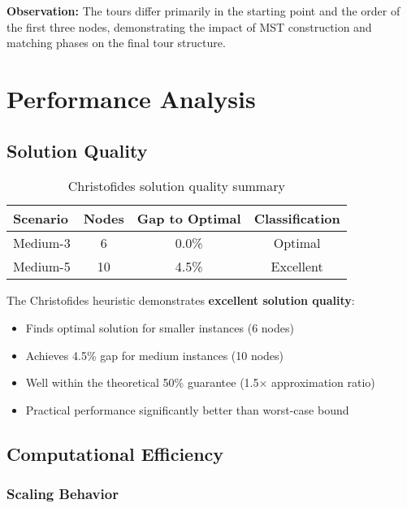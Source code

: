 \documentclass[9pt,a4paper,twoside]{tau}
\begin{document}
\textbf{Observation:} The tours differ primarily in the starting point and the order of the first three nodes, demonstrating the impact of MST construction and matching phases on the final tour structure.


\section{Performance Analysis}

\subsection{Solution Quality}

\begin{table}[h]
\centering
\begin{tabular}{@{}lccc@{}}
\toprule
\textbf{Scenario} & \textbf{Nodes} & \textbf{Gap to Optimal} & \textbf{Classification} \\
\midrule
Medium-3 & 6 & 0.0\% & Optimal \\
Medium-5 & 10 & 4.5\% & Excellent \\
\bottomrule
\end{tabular}
\caption{Christofides solution quality summary}
\label{tab:quality}
\end{table}

The Christofides heuristic demonstrates \textbf{excellent solution quality}:
\begin{itemize}
    \item Finds optimal solution for smaller instances (6 nodes)
    \item Achieves 4.5\% gap for medium instances (10 nodes)
    \item Well within the theoretical 50\% guarantee (1.5$\times$ approximation ratio)
    \item Practical performance significantly better than worst-case bound
\end{itemize}

\subsection{Computational Efficiency}

\subsubsection{Scaling Behavior}
\end{document}
